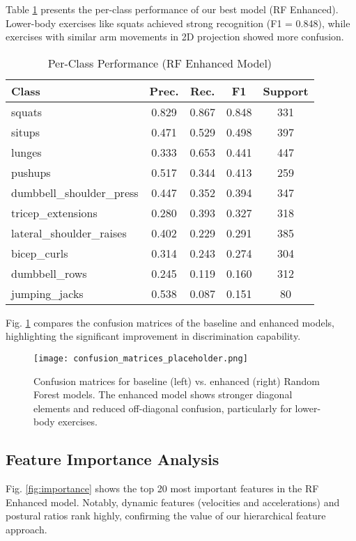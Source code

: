 \documentclass[conference]{IEEEtran}
\begin{document}
Table \ref{tab:per_class} presents the per-class performance of our best model (RF Enhanced). Lower-body exercises like squats achieved strong recognition (F1 = 0.848), while exercises with similar arm movements in 2D projection showed more confusion.

\begin{table}[ht]
\caption{Per-Class Performance (RF Enhanced Model)}
\label{tab:per_class}
\centering
\begin{tabular}{lcccc}
\toprule
\textbf{Class} & \textbf{Prec.} & \textbf{Rec.} & \textbf{F1} & \textbf{Support} \\
\midrule
squats & 0.829 & 0.867 & 0.848 & 331 \\
situps & 0.471 & 0.529 & 0.498 & 397 \\
lunges & 0.333 & 0.653 & 0.441 & 447 \\
pushups & 0.517 & 0.344 & 0.413 & 259 \\
dumbbell\_shoulder\_press & 0.447 & 0.352 & 0.394 & 347 \\
tricep\_extensions & 0.280 & 0.393 & 0.327 & 318 \\
lateral\_shoulder\_raises & 0.402 & 0.229 & 0.291 & 385 \\
bicep\_curls & 0.314 & 0.243 & 0.274 & 304 \\
dumbbell\_rows & 0.245 & 0.119 & 0.160 & 312 \\
jumping\_jacks & 0.538 & 0.087 & 0.151 & 80 \\
\bottomrule
\end{tabular}
\end{table}

Fig. \ref{fig:confusion} compares the confusion matrices of the baseline and enhanced models, highlighting the significant improvement in discrimination capability.

\begin{figure}[ht]
\centering
\texttt{[image: confusion\_matrices\_placeholder.png]}
\caption{Confusion matrices for baseline (left) vs. enhanced (right) Random Forest models. The enhanced model shows stronger diagonal elements and reduced off-diagonal confusion, particularly for lower-body exercises.}
\label{fig:confusion}
\end{figure}

\subsection{Feature Importance Analysis}
Fig. \ref{fig:importance} shows the top 20 most important features in the RF Enhanced model. Notably, dynamic features (velocities and accelerations) and postural ratios rank highly, confirming the value of our hierarchical feature approach.
\end{document}
